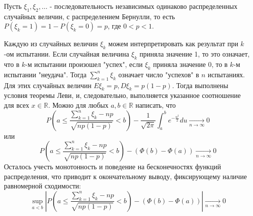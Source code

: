 \begin{theorem}
	Пусть $\xi_1, \xi_2, \dots$ - последовательность независимых одинаково распределенных случайных величин, с распределением Бернулли, то есть $P (\xi_k = 1) = 1 - P(\xi_k = 0) = p$, где $0 < p < 1$.
	
	Каждую из случайных величин $\xi_k$ можем интерпретировать как результат при $k$-ом испытании. Если случайная величина $\xi_k$ приняла значение 1, то это означает, что в $k$-м испытании произошел "успех", если $\xi_k$ приняла значение 0, то в $k$-м испытании "неудача". Тогда $\sum\limits_{k=1}^{n} \xi_k$ означает число "успехов" в $n$ испытаниях. Для этих случайных величин $E\xi_k = p, D\xi_k = p(1-p)$. Тогда выполнены условия теоремы Леви, и, следовательно, выполняется указанное соотношение для всех $x \in \mathbb{R}$. Можно для любых $a, b \in \mathbb{R}$ написать, что
	\[ P \left( a \le \frac{\sum\limits_{k=1}^{n} \xi_k - np}{\sqrt{np (1-p)}} < b \right) - \frac{1}{\sqrt{2 \pi}} \int_{a}^{b} e^{- \frac{u^2}{2}} du \underset{n \to \infty}{\to} 0 \]
	или
	\[ P \left( a \le \frac{\sum\limits_{k=1}^{n} \xi_k - np}{\sqrt{np (1-p)}} < b \right) - (\Phi(b) - \Phi(a)) \underset{n \to \infty}{\to} 0 \]
	Осталось учесть монотонность и поведение на бесконечностях функций распределения, что приводит к окончательному выводу, фиксирующему наличие равномерной сходимости:
	\[ \sup_{a < b} \left| P \left( a \le \frac{\sum\limits_{k=1}^{n} \xi_k - np}{\sqrt{np (1-p)}} < b \right) - (\Phi(b) - \Phi(a)) \right| \underset{n \to \infty}{\to} 0 \]
\end{theorem}

